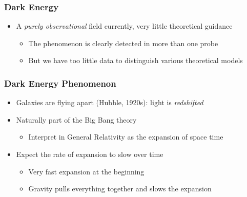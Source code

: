 \documentclass{beamer}
\begin{document}
\frame
{
    \frametitle{Dark Energy}

 
    \begin{itemize}

        \item A {\em purely observational} field currently, very little
            theoretical guidance
        \begin{itemize}
            \item The phenomenon is clearly detected in more than one probe
            \item But we have too little data to distinguish various 
                theoretical models
        \end{itemize}

    \end{itemize}

}



\frame
{
    \frametitle{Dark Energy Phenomenon}

 
    \begin{itemize}

        \item Galaxies are flying apart (Hubble, 1920s): light is {\color{gold} {\em redshifted} }
        \item Naturally part of the Big Bang theory
        \begin{itemize}
            \item Interpret in General Relativity as the expansion of space time
        \end{itemize}

        \item Expect the rate of expansion to slow over time
        \begin{itemize}
            \item Very fast expansion at the beginning
            \item Gravity pulls everything together and slows the expansion
        \end{itemize}

    \end{itemize}

}
\end{document}
